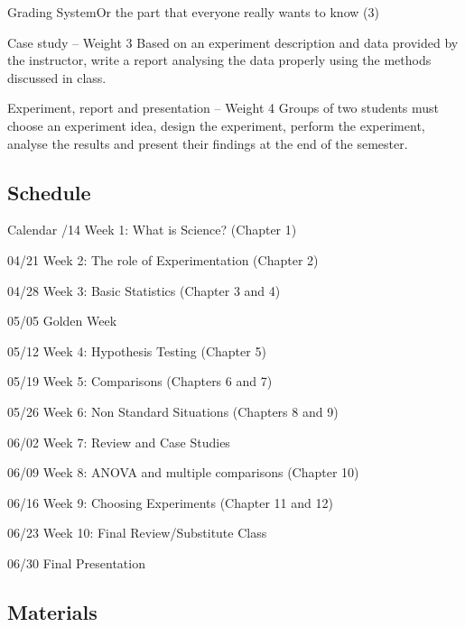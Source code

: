 \documentclass[t]{beamer}
\begin{document}
\begin{ftst}
  {Grading System}{Or the part that everyone really wants to know (3)}
  \begin{block}{Case study -- Weight 3}
    Based on an experiment description and data provided by the
    instructor, write a report analysing the data properly using the
    methods discussed in class.
  \end{block}
  \begin{block}{Experiment, report and presentation -- Weight 4}
    Groups of two students must choose an experiment idea, design the
    experiment, perform the experiment, analyse the results and
    present their findings at the end of the semester.
  \end{block}
\end{ftst}

\subsection{Schedule}

\begin{ftst}
{Calendar}{}
/14 Week 1: What is Science? (Chapter 1)
\item 04/21 Week 2: The role of Experimentation (Chapter 2)
\item 04/28 Week 3: Basic Statistics (Chapter 3 and 4)
\item 05/05 \alert{Golden Week}
\item 05/12 Week 4: Hypothesis Testing (Chapter 5)
\item 05/19 Week 5: Comparisons (Chapters 6 and 7)
\item 05/26 Week 6: Non Standard Situations (Chapters 8 and 9)
\item 06/02 \alert{Week 7: Review and Case Studies}
\item 06/09 Week 8: ANOVA and multiple comparisons (Chapter 10)
\item 06/16 Week 9: Choosing Experiments (Chapter 11 and 12)
\item 06/23 Week 10: Final Review/Substitute Class
\item 06/30 \alert{Final Presentation}
\eitem
\end{ftst}

\subsection{Materials}
\end{document}
